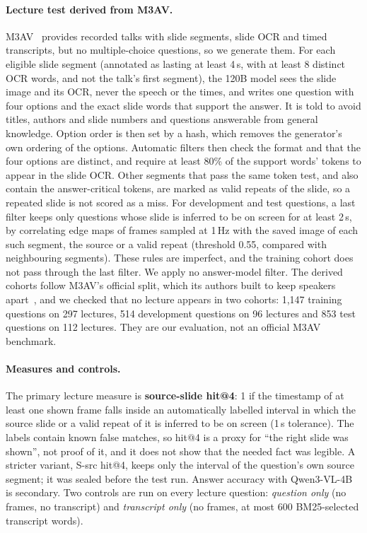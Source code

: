 \paragraph{Lecture test derived from M3AV.}
M3AV~\cite{chen2024m3av} provides recorded talks with slide segments, slide OCR and timed transcripts, but no multiple-choice questions, so we generate them.
For each eligible slide segment (annotated as lasting at least 4\,s, with at least 8 distinct OCR words, and not the talk's first segment), the 120B model sees the slide image and its OCR, never the speech or the times, and writes one question with four options and the exact slide words that support the answer.
It is told to avoid titles, authors and slide numbers and questions answerable from general knowledge.
Option order is then set by a hash, which removes the generator's own ordering of the options.
Automatic filters then check the format and that the four options are distinct, and require at least 80\% of the support words' tokens to appear in the slide OCR.
Other segments that pass the same token test, and also contain the answer-critical tokens, are marked as valid repeats of the slide, so a repeated slide is not scored as a miss.
For development and test questions, a last filter keeps only questions whose slide is inferred to be on screen for at least 2\,s, by correlating edge maps of frames sampled at 1\,Hz with the saved image of each such segment, the source or a valid repeat (threshold 0.55, compared with neighbouring segments).
These rules are imperfect, and the training cohort does not pass through the last filter.
We apply no answer-model filter.
The derived cohorts follow M3AV's official split, which its authors built to keep speakers apart~\cite{chen2024m3av}, and we checked that no lecture appears in two cohorts: 1,147 training questions on 297 lectures, 514 development questions on 96 lectures and 853 test questions on 112 lectures.
They are our evaluation, not an official M3AV benchmark.

\paragraph{Measures and controls.}
The primary lecture measure is \textbf{source-slide hit@4}: 1 if the timestamp of at least one shown frame falls inside an automatically labelled interval in which the source slide or a valid repeat of it is inferred to be on screen (1\,s tolerance).
The labels contain known false matches, so hit@4 is a proxy for ``the right slide was shown'', not proof of it, and it does not show that the needed fact was legible.
A stricter variant, S-src hit@4, keeps only the interval of the question's own source segment; it was sealed before the test run.
Answer accuracy with Qwen3-VL-4B is secondary.
Two controls are run on every lecture question: \emph{question only} (no frames, no transcript) and \emph{transcript only} (no frames, at most 600 BM25-selected transcript words).

